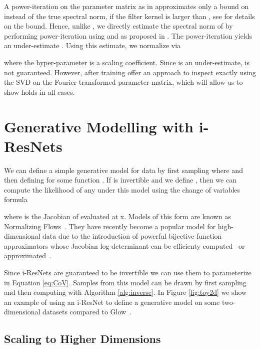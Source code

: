 \documentclass{article}
\begin{document}
A power-iteration on the parameter matrix as in \citet{miyato2018spectral} approximates only a bound on  instead of the true spectral norm, if the filter kernel is larger than , see \citet{tsuzuku2018lipschitz} for details on the bound. Hence, unlike \citet{miyato2018spectral}, we directly estimate the spectral norm of  by performing power-iteration using  and  as proposed in \citet{gouk}. The power-iteration yields an under-estimate . Using this estimate, we normalize via

where the hyper-parameter  is a scaling coefficient. Since  is an under-estimate,  is not guaranteed. However, after training \citet{singularValConv} offer an approach to inspect  exactly using the SVD on the Fourier transformed parameter matrix, which will allow us to show  holds in all cases. 





\section{Generative Modelling with i-ResNets}
\label{sec:maxLikelihood}

We can define a simple generative model for data  by first sampling  where  and then defining  for some function . If  is invertible and we define , then we can compute the likelihood of any  under this model using the change of variables formula

where  is the Jacobian of  evaluated at x. Models of this form are known as Normalizing Flows~\citep{rezende2015variational}. They have recently become a popular model for high-dimensional data due to the introduction of powerful bijective function approximators whose Jacobian log-determinant can be efficienty  computed~\citep{dinh2014nice, dinh2016density, kingma2018glow, chen2018neural} or approximated~\cite{ffjord}.

Since i-ResNets are guaranteed to be invertible we can use them to parameterize  in Equation \eqref{eq:CoV}. Samples from this model can be drawn by first sampling  and then computing  with Algorithm \ref{alg:inverse}. In Figure \ref{fig:toy2d} we show an example of using an i-ResNet to define a generative model on some two-dimensional datasets compared to Glow~\citep{kingma2018glow}.



\subsection{Scaling to Higher Dimensions}
\end{document}
